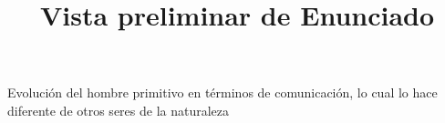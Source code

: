 \documentclass[a4paper,12pt]{article}\usepackage[utf8]{inputenc}\usepackage[spanish]{babel}\usepackage{times}
\title{Vista preliminar de Enunciado}
\begin{document}
\twocolumn 

\maketitle

Evolución del hombre primitivo en términos de             comunicación, lo cual lo hace diferente de otros seres de la naturaleza
\end{document}
